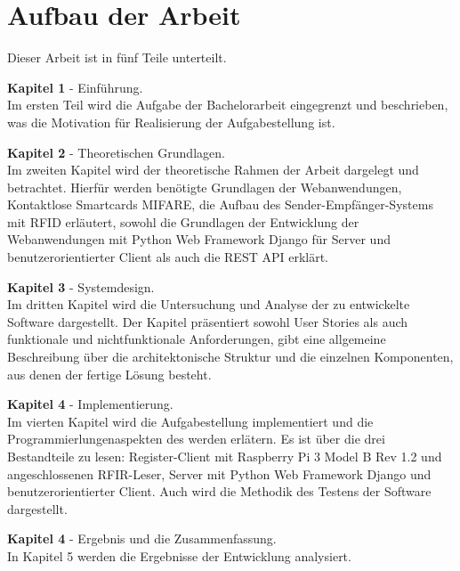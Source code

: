 \section{Aufbau der Arbeit}
\label{sec:intro:themengebiet}
Dieser Arbeit ist in fünf Teile unterteilt. 

\textbf{Kapitel 1} - Einführung.\\
Im ersten Teil wird die Aufgabe der Bachelorarbeit eingegrenzt und beschrieben, was die Motivation für Realisierung der Aufgabestellung ist. 

\textbf{Kapitel 2} - Theoretischen Grundlagen.\\ 
Im zweiten Kapitel wird der theoretische Rahmen der Arbeit dargelegt und betrachtet. Hierfür
werden benötigte Grundlagen der Webanwendungen, Kontaktlose Smartcards MIFARE, die Aufbau des Sender-Empfänger-Systems mit RFID erläutert, sowohl die Grundlagen der Entwicklung der Webanwendungen mit Python Web Framework Django für Server und benutzerorientierter Client als auch die REST API erklärt.

\textbf{Kapitel 3} - Systemdesign.\\
Im dritten Kapitel wird die Untersuchung und Analyse der zu entwickelte Software dargestellt. Der Kapitel präsentiert sowohl User Stories als auch funktionale und nichtfunktionale Anforderungen, gibt eine allgemeine Beschreibung über die architektonische Struktur und die einzelnen Komponenten, aus denen der fertige Lösung besteht.

\textbf{Kapitel 4} - Implementierung.\\
Im vierten Kapitel wird die Aufgabestellung implementiert und die Programmierlungenaspekten des werden erlätern. Es ist über die drei Bestandteile zu lesen: Register-Client mit Raspberry Pi 3 Model B Rev 1.2 und angeschlossenen RFIR-Leser, Server mit Python Web Framework Django und benutzerorientierter Client. Auch wird die Methodik des Testens der Software dargestellt.

\textbf{Kapitel 4} - Ergebnis und die Zusammenfassung.\\
In Kapitel 5 werden die Ergebnisse der Entwicklung analysiert.

